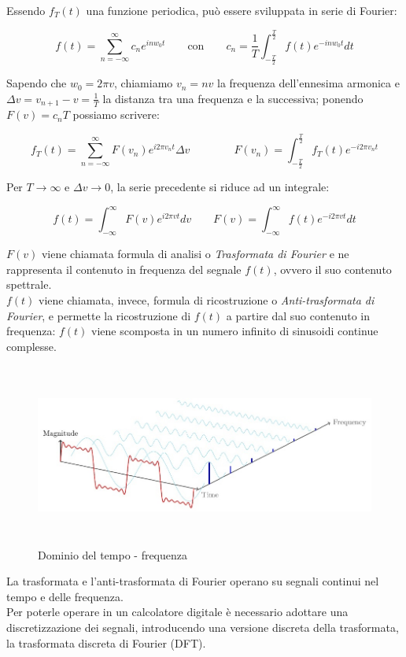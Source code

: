 \documentclass[12pt]{report}
\begin{document}
Essendo $f_T(t)$ una funzione periodica, può essere sviluppata in serie di Fourier:

$$ f(t) = \sum_{n = -\infty}^{\infty} c_ne^{inw_0t} \qquad \mbox{con} \qquad c_n = \frac{1}{T}\int_{-\frac{T}{2}}^\frac{T}{2}f(t)e^{-inw_0t}dt$$

Sapendo che $w_0 = 2\pi v$, chiamiamo $v_n = nv$ la frequenza dell'ennesima armonica e $\Delta v = v_{n+1}-v = \frac{1}{T}$ la distanza tra una frequenza e la successiva; ponendo $F(v) = c_nT$ possiamo scrivere:

$$ f_T(t) = \sum_{n = -\infty}^\infty F(v_n)e^{i2\pi v_nt}\Delta v \qquad 
 \qquad F(v_n) = \int_{-\frac{T}{2}}^\frac{T}{2} f_T(t)e^{-i2\pi v_nt} $$

Per $ T\rightarrow\infty$ e $\Delta v \rightarrow 0$, la serie precedente si riduce ad un integrale:

$$	f(t) = \int_{-\infty}^\infty F(v)e^{i2\pi vt}dv \qquad F(v) = \int_{-\infty}^\infty f(t)e^{-i2\pi vt}dt
$$

$F(v)$ viene chiamata formula di analisi o {\itshape Trasformata di Fourier} e ne rappresenta il contenuto in frequenza del segnale $f(t)$, ovvero il suo contenuto spettrale.\\
$f(t)$ viene chiamata, invece, formula di ricostruzione o {\itshape Anti-trasformata di Fourier}, e permette la ricostruzione di $f(t)$ a partire dal suo contenuto in frequenza: $f(t)$ viene scomposta in un numero infinito di sinusoidi continue complesse.	
\\

\begin{figure}[htbp]
\centerline{\includegraphics[height=60mm]{img/fourier_transform}}
\caption{Dominio del tempo - frequenza}
\label{fig:fourier_transform}
\end{figure}

La trasformata e l'anti-trasformata di Fourier operano su segnali continui nel tempo e delle frequenza. \\
Per poterle operare in un calcolatore digitale è necessario adottare una discretizzazione dei segnali, introducendo una versione discreta della trasformata, la trasformata discreta di Fourier (DFT).
\end{document}
